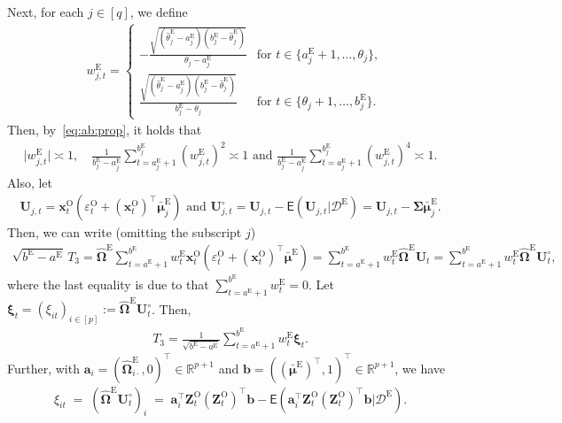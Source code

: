 \documentclass[11pt, a4paper]{article}
\newcommand{\mbf}{\mathbf}
\newcommand{\mc}{\mathcal}
\newcommand{\vep}{\varepsilon}
\renewcommand{\l}{\left}
\renewcommand{\r}{\right}
\def\wh{\widehat}
\newcommand{\cp}{\theta}
\newcommand{\E}[0]{\mathsf{E}}
\newcommand{\R}{\mathbb{R}}
\newcommand{\tE}{\text{E}}
\newcommand{\tO}{\text{O}}
\theoremstyle{definition}
\theoremstyle{definition}
\theoremstyle{definition}
\theoremstyle{definition}
\theoremstyle{definition}
\theoremstyle{remark}
\theoremstyle{definition}
\theoremstyle{definition}
\theoremstyle{definition}
\begin{document}
Next, for each $j \in [q]$, we define
\begin{align*}
& w^{\tE}_{j, t} = \l\{\begin{array}{ll}-
\frac{\sqrt{(\wh\cp^{\tE}_j - a^{\tE}_j) (b^{\tE}_j - \wh\cp^{\tE}_j)}}{\cp_j - a^{\tE}_j} & \text{for \ } t \in \{a^{\tE}_j + 1, \ldots, \cp_j\}, \\
\frac{\sqrt{(\wh\cp^{\tE}_j - a^{\tE}_j) (b^{\tE}_j - \wh\cp^{\tE}_j)}}{b^{\tE}_j - \cp_j} & \text{for \ } t \in \{\cp_j + 1, \ldots, b^{\tE}_j\}.
\end{array}\r.
\end{align*}
Then, by~\eqref{eq:ab:prop}, it holds that 
\begin{align}
\label{eq:weights}
\vert w^{\tE}_{j, t} \vert \asymp 1, \quad 
\frac{1}{b^{\tE}_j - a^{\tE}_j} \sum_{t = a^{\tE}_j + 1}^{b^{\tE}_j} (w^{\tE}_{j, t})^2 \asymp 1 \text{ \ and \ }
\frac{1}{b^{\tE}_j - a^{\tE}_j} \sum_{t = a^{\tE}_j + 1}^{b^{\tE}_j} (w^{\tE}_{j, t})^4 \asymp 1.
\end{align}
Also, let 
\begin{align}
\label{eq:def:ujt}
\mbf U_{j, t} = \mbf x^{\tO}_t ( \vep^{\tO}_t + (\mbf x^{\tO}_t)^\top \bar{\bm\mu}^{\tE}_j )
\text{ and }
\mbf U^{\circ}_{j, t} = \mbf U_{j, t} - \E(\mbf U_{j, t} \vert \mc D^{\tE}) = \mbf U_{j, t} - \bm\Sigma \bar{\bm\mu}^{\tE}_j.
\end{align}
Then, we can write (omitting the subscript $j$)
\begin{align*}
\sqrt{ b^{\tE} - a^{\tE} }\,T_3 = \wh{\bm\Omega}^{\tE} \sum_{t = a^{\tE} + 1}^{b^{\tE}} w^{\tE}_t \mbf x^{\tO}_t ( \vep^{\tO}_t + (\mbf x^{\tO}_t)^\top \bar{\bm\mu}^{\tE} ) = \sum_{t = a^{\tE} + 1}^{b^{\tE}} w^{\tE}_t \wh{\bm\Omega}^{\tE}\mbf U_t
= \sum_{t = a^{\tE} + 1}^{b^{\tE}} w^{\tE}_t \wh{\bm\Omega}^{\tE} \mbf U^{\circ}_t,
\end{align*}
where the last equality is due to that $\sum_{t = a^{\tE} +1}^{b^{\tE}}w^{\tE}_t = 0$. Let $\bm\xi_t = (\xi_{it})_{i \in [p]} := \wh{\bm\Omega}^{\tE} \mbf U^{\circ}_t$. Then,
\begin{align}\label{eq:defT3}
T_3 = \frac{1}{\sqrt{ b^{\tE} - a^{\tE} }} \sum_{t = a^{\tE} + 1}^{b^{\tE}} w^{\tE}_t \bm\xi_t.
\end{align}
Further, with $\mbf a_i = (\wh{\bm\Omega}^{\tE}_{i\cdot}, 0)^\top \in \R^{p+1}$ and $\mbf b = ((\bar{\bm\mu}^{\tE})^\top, 1)^\top \in \mathbb{R}^{p+1}$, we have
\begin{align*}
\xi_{it}\;=\;(\wh{\bm\Omega}^{\tE}\mbf U^\circ_{t})_i \; = \; \mbf a_i^\top \mbf Z^{\tO}_t \l(\mbf Z^{\tO}_t\r)^\top \mbf b - \E\l(\mbf a_i^\top \mbf Z^{\tO}_t \l(\mbf Z^{\tO}_t\r)^\top \mbf b \Big\vert \mc D^{\tE}\r).
\end{align*}
\end{document}
